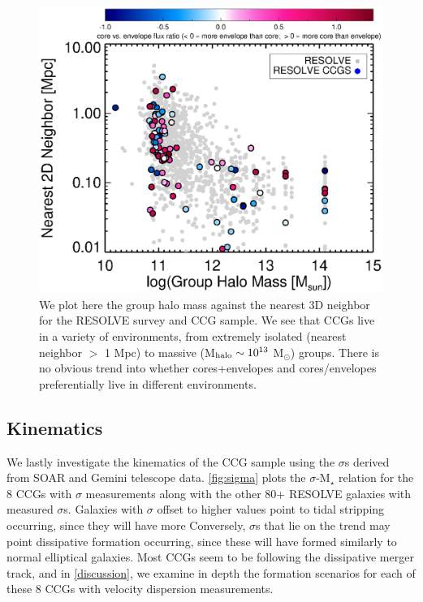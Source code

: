 \documentclass[iop,apj]{emulateapj}
\begin{document}
\begin{figure}[hbpt!]
\begin{center}
\includegraphics{nn_groupmass_2d.eps}
\caption{We plot here the group halo mass against the nearest 3D neighbor for the RESOLVE survey and CCG sample. We see that CCGs live in a variety of environments, from extremely isolated (nearest neighbor $>$ 1 Mpc) to massive (M$_{\rm halo} \sim 10^{13}$ M$_{\odot}$) groups. There is no obvious trend into whether cores+envelopes and cores/envelopes preferentially live in different environments.}
\label{fig:envplot}
\end{center}
\end{figure}

\subsection{Kinematics}
\label{kin}
\noindent We lastly investigate the kinematics of the CCG sample using the $\sigma$s derived from SOAR and Gemini telescope data. \autoref{fig:sigma} plots the $\sigma$-M$_{\star}$ relation for the 8 CCGs with $\sigma$ measurements along with the other 80+ RESOLVE galaxies with measured $\sigma$s. Galaxies with $\sigma$ offset to higher values point to tidal stripping occurring, since  they will have more  Conversely, $\sigma$s that lie on the trend may point dissipative formation occurring, since these will have formed similarly to normal elliptical galaxies. Most CCGs seem to be following the dissipative merger track, and in \autoref{discussion}, we examine in depth the formation scenarios for each of these 8 CCGs with velocity dispersion measurements.
\end{document}
